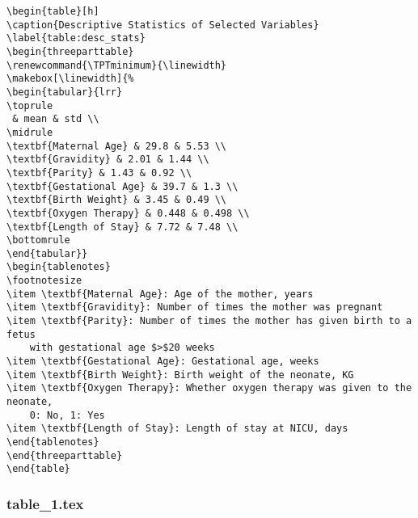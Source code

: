 \documentclass[11pt]{article}
\begin{document}
\begin{Verbatim}[tabsize=4]
\begin{table}[h]
\caption{Descriptive Statistics of Selected Variables}
\label{table:desc_stats}
\begin{threeparttable}
\renewcommand{\TPTminimum}{\linewidth}
\makebox[\linewidth]{%
\begin{tabular}{lrr}
\toprule
 & mean & std \\
\midrule
\textbf{Maternal Age} & 29.8 & 5.53 \\
\textbf{Gravidity} & 2.01 & 1.44 \\
\textbf{Parity} & 1.43 & 0.92 \\
\textbf{Gestational Age} & 39.7 & 1.3 \\
\textbf{Birth Weight} & 3.45 & 0.49 \\
\textbf{Oxygen Therapy} & 0.448 & 0.498 \\
\textbf{Length of Stay} & 7.72 & 7.48 \\
\bottomrule
\end{tabular}}
\begin{tablenotes}
\footnotesize
\item \textbf{Maternal Age}: Age of the mother, years
\item \textbf{Gravidity}: Number of times the mother was pregnant
\item \textbf{Parity}: Number of times the mother has given birth to a fetus
	with gestational age $>$20 weeks
\item \textbf{Gestational Age}: Gestational age, weeks
\item \textbf{Birth Weight}: Birth weight of the neonate, KG
\item \textbf{Oxygen Therapy}: Whether oxygen therapy was given to the neonate,
	0: No, 1: Yes
\item \textbf{Length of Stay}: Length of stay at NICU, days
\end{tablenotes}
\end{threeparttable}
\end{table}

\end{Verbatim}

\subsubsection*{table\_1.tex}
\end{document}
